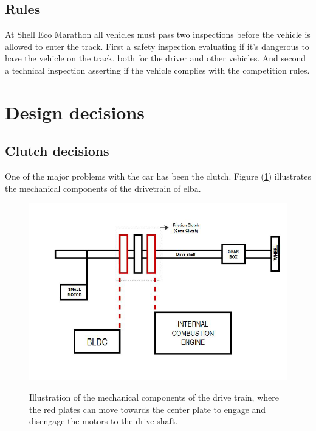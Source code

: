 \subsection{Rules}
At Shell Eco Marathon all vehicles must pass two inspections before the vehicle
is allowed to enter the track. First a safety inspection evaluating if it's
dangerous to have the vehicle on the track, both for the driver and other
vehicles. And second a technical inspection asserting if the vehicle complies
with the competition rules.

\section{Design decisions}
\subsection{Clutch decisions}

One of the major problems with the car has been the clutch. Figure (\ref{fig:Drivetrain}) illustrates the mechanical components of the drivetrain of elba.

\begin{figure}[H]
    \centering\label{fig:Drivetrain}
    \includegraphics[width=1\textwidth]{./img/Drivetrain}
    \caption{Illustration of the mechanical components of the drive train, where the red plates can move towards the center plate to engage and disengage the motors to the drive shaft.}
\end{figure}


